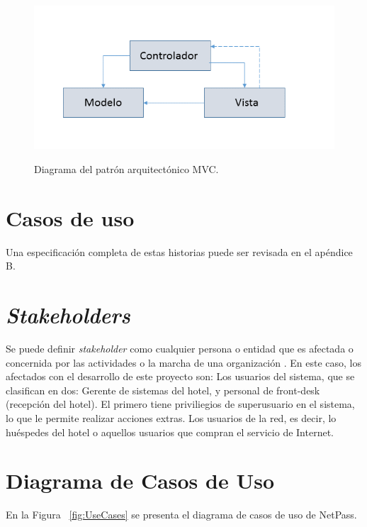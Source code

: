 \begin{figure}[ht]
  \centering
  \includegraphics[scale=0.6,type=png,ext=.png,read=.png]{imagenes/mvc} \\
  \centering
  \caption{Diagrama del patrón arquitectónico MVC.}
  \label{fig:mvc}
\end{figure}


\section{Casos de uso} \label{sect:Casos de usos}
		Una especificación completa de estas historias puede ser revisada en el apéndice B.


\section{\textit{Stakeholders}} \label{sect:Stakeholders}
		Se puede definir \textit{stakeholder} como cualquier persona o entidad que es afectada o concernida por las actividades o la marcha de una organización \cite{MTSH}. En este caso, los afectados con el desarrollo de este proyecto son: 
\newline
\indent Los usuarios del sistema, que se clasifican en dos: Gerente de sistemas del hotel, y personal de front-desk (recepción del hotel). El primero tiene priviliegios de superusuario en el sistema, lo que le permite realizar acciones extras. 
\newline
\indent Los usuarios de la red, es decir, lo huéspedes del hotel o aquellos usuarios que compran el servicio de Internet. 

\section{Diagrama de Casos de Uso} \label{sect:Casos de uso}
En la Figura ~\ref{fig:UseCases} se presenta el diagrama de casos de uso de NetPass. 

